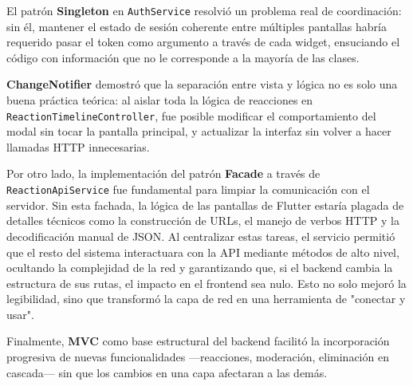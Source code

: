El patrón \textbf{Singleton} en \texttt{AuthService} resolvió un problema real
de coordinación: sin él, mantener el estado de sesión coherente entre múltiples
pantallas habría requerido pasar el token como argumento a través de cada widget,
ensuciando el código con información que no le corresponde a la mayoría de
las clases.

\textbf{ChangeNotifier} demostró que la separación entre vista y lógica no es
solo una buena práctica teórica: al aislar toda la lógica de reacciones en
\texttt{ReactionTimelineController}, fue posible modificar el comportamiento del
modal sin tocar la pantalla principal, y actualizar la interfaz sin volver a
hacer llamadas HTTP innecesarias.

Por otro lado, la implementación del patrón \textbf{Facade} a través de \texttt{ReactionApiService} fue fundamental para limpiar la comunicación con el servidor. Sin esta fachada, la lógica de las pantallas de Flutter estaría plagada de detalles técnicos como la construcción de URLs, el manejo de verbos HTTP y la decodificación manual de JSON. Al centralizar estas tareas, el servicio permitió que el resto del sistema interactuara con la API mediante métodos de alto nivel, ocultando la complejidad de la red y garantizando que, si el backend cambia la estructura de sus rutas, el impacto en el frontend sea nulo. Esto no solo mejoró la legibilidad, sino que transformó la capa de red en una herramienta de "conectar y usar".

Finalmente, \textbf{MVC} como base estructural del backend facilitó la
incorporación progresiva de nuevas funcionalidades ---reacciones, moderación,
eliminación en cascada--- sin que los cambios en una capa afectaran a las demás.